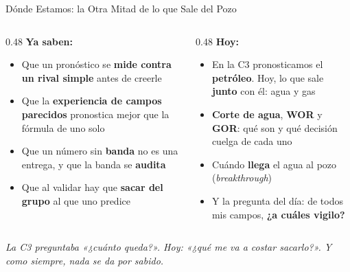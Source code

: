 \documentclass[aspectratio=169, 11pt]{beamer}
\begin{document}
\begin{frame}[shrink=8]{Dónde Estamos: la Otra Mitad de lo que Sale del Pozo}
  \vspace{-2pt}
  \begin{columns}[T]
    \begin{column}{0.48\textwidth}
      {\small\color{arcaDark}\bfseries\faCheckCircle\hspace{5pt}Ya saben:}
      \vspace{4pt}
      {\footnotesize\color{textMuted}
      \begin{itemize}\setlength{\itemsep}{4pt}
        \item[{\color{codeGreen}\scriptsize\faCheck}]
          Que un pronóstico se \textbf{mide contra un rival simple} antes de
          creerle
        \item[{\color{codeGreen}\scriptsize\faCheck}]
          Que la \textbf{experiencia de campos parecidos} pronostica mejor que
          la fórmula de uno solo
        \item[{\color{codeGreen}\scriptsize\faCheck}]
          Que un número sin \textbf{banda} no es una entrega, y que la banda
          se \textbf{audita}
        \item[{\color{codeGreen}\scriptsize\faCheck}]
          Que al validar hay que \textbf{sacar del grupo} al que uno predice
      \end{itemize}}
    \end{column}
    \begin{column}{0.48\textwidth}
      {\small\color{arcaDark}\bfseries\faForward\hspace{5pt}Hoy:}
      \vspace{4pt}
      {\footnotesize\color{textMuted}
      \begin{itemize}\setlength{\itemsep}{4pt}
        \item[{\color{arcaRed}\scriptsize\faArrowRight}]
          En la C3 pronosticamos el \textbf{petróleo}. Hoy, lo que sale
          \textbf{junto} con él: agua y gas
        \item[{\color{arcaRed}\scriptsize\faArrowRight}]
          \textbf{Corte de agua}, \textbf{WOR} y \textbf{GOR}: qué son y qué
          decisión cuelga de cada uno
        \item[{\color{arcaRed}\scriptsize\faArrowRight}]
          Cuándo \textbf{llega} el agua al pozo (\emph{breakthrough})
        \item[{\color{arcaRed}\scriptsize\faStar}]
          Y la pregunta del día: de todos mis campos, \textbf{¿a cuáles vigilo?}
      \end{itemize}}
    \end{column}
  \end{columns}
  \vspace{5pt}
  {\scriptsize\color{arcaDark}\itshape
   La C3 preguntaba «¿cuánto queda?». Hoy: «¿qué me va a costar sacarlo?».
   Y como siempre, nada se da por sabido.}
\end{frame}
\end{document}
